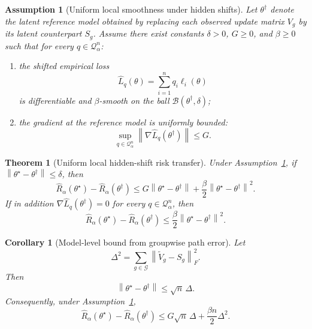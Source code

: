 \documentclass{article}
\newtheorem{theorem}{Theorem}
\newtheorem{corollary}{Corollary}
\newtheorem{assumption}{Assumption}
\newcommand{\cB}{\mathcal{B}}
\newcommand{\cG}{\mathcal{G}}
\newcommand{\cQ}{\mathcal{Q}}
\newcommand{\norm}[1]{\left\lVert #1 \right\rVert}
\newcommand{\loss}{\ell}
\begin{document}
\begin{assumption}[Uniform local smoothness under hidden shifts]
\label{ass:local_smooth}
Let \(\theta^\dagger\) denote the latent reference model obtained by replacing each observed update matrix \(V_g\) by its latent counterpart \(S_g\). Assume there exist constants \(\delta>0\), \(G\ge 0\), and \(\beta\ge 0\) such that for every \(q\in\cQ_\alpha^n\):
\begin{enumerate}[leftmargin=1.4em]
    \item the shifted empirical loss
    \[
    \widehat L_q(\theta)
    =
    \sum_{i=1}^{n} q_i \loss_i(\theta)
    \]
    is differentiable and \(\beta\)-smooth on the ball \(\cB(\theta^\dagger,\delta)\);
    \item the gradient at the reference model is uniformly bounded:
    \[
    \sup_{q\in\cQ_\alpha^n} \norm{\nabla \widehat L_q(\theta^\dagger)} \le G.
    \]
\end{enumerate}
\end{assumption}

\begin{theorem}[Uniform local hidden-shift risk transfer]
\label{thm:risk_transfer}
Under Assumption~\ref{ass:local_smooth}, if \(\norm{\theta^\star - \theta^\dagger}\le \delta\), then
\begin{equation}
\widehat R_\alpha(\theta^\star) - \widehat R_\alpha(\theta^\dagger)
\le
G \norm{\theta^\star - \theta^\dagger}
+
\frac{\beta}{2}\norm{\theta^\star - \theta^\dagger}^2.
\label{eq:risk_transfer}
\end{equation}
If in addition \(\nabla \widehat L_q(\theta^\dagger)=0\) for every \(q\in\cQ_\alpha^n\), then
\begin{equation}
\widehat R_\alpha(\theta^\star) - \widehat R_\alpha(\theta^\dagger)
\le
\frac{\beta}{2}\norm{\theta^\star - \theta^\dagger}^2.
\label{eq:risk_transfer_stationary}
\end{equation}
\end{theorem}

\begin{corollary}[Model-level bound from groupwise path error]
\label{cor:model_level}
Let
\[
\Delta^2 = \sum_{g\in\cG} \norm{\widetilde V_g - S_g}_F^2.
\]
Then
\begin{equation}
\norm{\theta^\star - \theta^\dagger} \le \sqrt{n}\,\Delta.
\label{eq:model_distance}
\end{equation}
Consequently, under Assumption~\ref{ass:local_smooth},
\begin{equation}
\widehat R_\alpha(\theta^\star) - \widehat R_\alpha(\theta^\dagger)
\le
G \sqrt{n}\,\Delta
+
\frac{\beta n}{2}\Delta^2.
\label{eq:combined_bound}
\end{equation}
\end{corollary}
\end{document}
